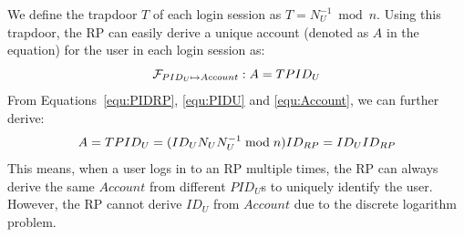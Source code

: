 \vspace{0.5mm}
 We define the trapdoor $T$ of each login session as $T = N_U^{-1} \bmod n$. 
Using this trapdoor, the RP can easily derive a unique account (denoted as $A$ in the equation) for the user in each login session as:%
\begin{equation}
\setlength{\abovedisplayskip}{3pt}
\setlength{\belowdisplayskip}{3pt}
   \mathcal{F}_{PID_{U} \mapsto Account}: A = {T}{PID_U}
   \label{equ:Account}
\end{equation}
From Equations~\ref{equ:PIDRP}, \ref{equ:PIDU} and \ref{equ:Account}, we can further derive:
\begin{equation*}
\setlength{\abovedisplayskip}{3pt}
\setlength{\belowdisplayskip}{3pt}
   A =  {T}{PID_{U}}
   = {(ID_U N_U N_U^{-1} \bmod n)}{ID_{RP}}
   = {ID_U}{ID_{RP}}
   \label{equ:AccountNotChanged}
\end{equation*}
This means, when a user logs in to an RP multiple times, the RP can always derive the same $Account$ from different $PID_U$s to uniquely identify the user. However, the RP cannot derive $ID_U$ from $Account$ due to the discrete logarithm problem. 

